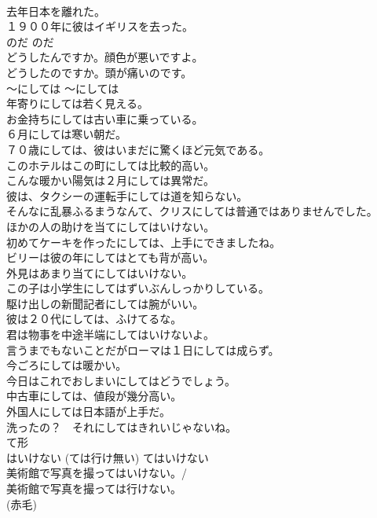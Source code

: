 \documentclass[8pt]{extreport}
\begin{document}
\begin{CJK}{UTF8}{min}
\\	去年日本を離れた。  
\\	１９００年に彼はイギリスを去った。  
\\	のだ	のだ	
\\	どうしたんですか。顔色が悪いですよ。   
\\	どうしたのですか。頭が痛いのです。   
\\	〜にしては	〜にしては	
\\	年寄りにしては若く見える。  
\\	お金持ちにしては古い車に乗っている。  
\\	６月にしては寒い朝だ。   
\\	７０歳にしては、彼はいまだに驚くほど元気である。   
\\	このホテルはこの町にしては比較的高い。   
\\	こんな暖かい陽気は２月にしては異常だ。   
\\	彼は、タクシーの運転手にしては道を知らない。  
\\	そんなに乱暴ふるまうなんて、クリスにしては普通ではありませんでした。   
\\	ほかの人の助けを当てにしてはいけない。   
\\	初めてケーキを作ったにしては、上手にできましたね。  
\\	ビリーは彼の年にしてはとても背が高い。   
\\	外見はあまり当てにしてはいけない。   
\\	この子は小学生にしてはずいぶんしっかりしている。  
\\	駆け出しの新聞記者にしては腕がいい。   
\\	彼は２０代にしては、ふけてるな。  
\\	君は物事を中途半端にしてはいけないよ。   
\\	言うまでもないことだがローマは１日にしては成らず。   
\\	今ごろにしては暖かい。   
\\	今日はこれでおしまいにしてはどうでしょう。   
\\	中古車にしては、値段が幾分高い。  
\\	外国人にしては日本語が上手だ。   
\\	洗ったの？　それにしてはきれいじゃないね。  
\\	て形
\\	はいけない (ては行け無い)	てはいけない	
\\	美術館で写真を撮ってはいけない。/
\\	美術館で写真を撮っては行けない。  
\\	(赤毛)

\end{CJK}
\end{document}
